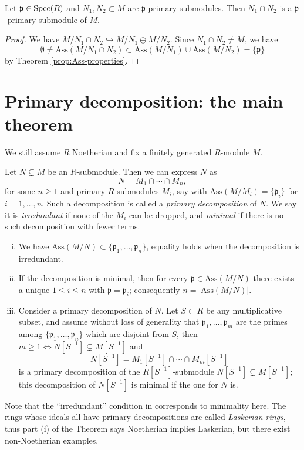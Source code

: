 \begin{lemma}\label{prop:intersection-primary}
	Let $\mathfrak{p} \in \operatorname{Spec}(R)$ and $N_1, N_2 \subset M$ are $\mathfrak{p}$-primary submodules. Then $N_1 \cap N_2$ is a $\mathfrak{p}$-primary submodule of $M$.
\end{lemma}
\begin{proof}
	We have $M/N_1 \cap N_2 \hookrightarrow M/N_1 \oplus M/N_2$. Since $N_1 \cap N_2 \neq M$, we have
	\[ \emptyset \neq \text{Ass}(M/N_1 \cap N_2) \subset \text{Ass}(M/N_1) \cup \text{Ass}(M/N_2) = \{\mathfrak{p}\} \]
	by Theorem \ref{prop:Ass-properties}.
\end{proof}

\section{Primary decomposition: the main theorem}
We still assume $R$ Noetherian and fix a finitely generated $R$-module $M$.

\begin{theorem}\label{prop:primary-decomp}
	Let $N \subsetneq M$ be an $R$-submodule. Then we can express $N$ as
	\[ N = M_1 \cap \cdots \cap M_n, \]
	for some $n \geq 1$ and primary $R$-submodules $M_i$, say with $\mathrm{Ass}(M/M_i) = \{\mathfrak{p}_i\}$ for $i = 1, \ldots, n$. Such a decomposition is called a \emph{primary decomposition} of $N$. We say it is \emph{irredundant} if none of the $M_i$ can be dropped, and \emph{minimal} if there is no such decomposition with fewer terms.
	\begin{enumerate}[(i)]
		\item We have $\mathrm{Ass}(M/N) \subset \{ \mathfrak{p}_1, \ldots, \mathfrak{p}_n \}$, equality holds when the decomposition is irredundant.
		\item If the decomposition is minimal, then for every $\mathfrak{p} \in \mathrm{Ass}(M/N)$ there exists a unique $1 \leq i \leq n$ with $\mathfrak{p} = \mathfrak{p}_i$; consequently $n = |\mathrm{Ass}(M/N)|$.
		\item Consider a primary decomposition of $N$. Let $S \subset R$ be any multiplicative subset, and assume without loss of generality that $\mathfrak{p}_1, \ldots, \mathfrak{p}_m$ are the primes among $\{\mathfrak{p}_1, \ldots, \mathfrak{p}_n \}$ which are disjoint from $S$, then $m \geq 1 \iff N[S^{-1}] \subsetneq M[S^{-1}]$ and
		\[ N[S^{-1}] = M_1[S^{-1}] \cap \cdots \cap M_m[S^{-1}] \]
		is a primary decomposition of the $R[S^{-1}]$-submodule $N[S^{-1}] \subsetneq M[S^{-1}]$; this decomposition of $N[S^{-1}]$ is minimal if the one for $N$ is.
	\end{enumerate}
\end{theorem}
Note that the ``irredundant'' condition in \cite[(8.D)]{Mat80} corresponds to minimality here. The rings whose ideals all have primary decompositions are called \emph{Laskerian rings}, thus part (i) of the Theorem says Noetherian implies Laskerian, but there exist non-Noetherian examples.

